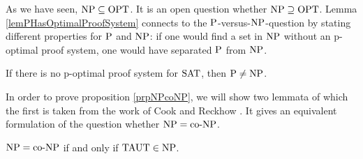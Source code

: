  As we have seen, \(\NP \subseteq \OPT\). It is an open question whether \(\NP \supseteq \OPT\). Lemma \ref{lemPHasOptimalProofSystem} connects to the \(\P\)-versus-\(\NP\)-question by stating different properties for \(\P\) and \(\NP\): if one would find a set in \(\NP\) without an p-optimal proof system, one would have separated \(\P\) from \(\NP\).

  \begin{corollary}
    If there is no p-optimal proof system for \(\SAT\), then \(\P \neq \NP\).
  \end{corollary}  
  
  In order to prove proposition \ref{prpNPcoNP}, we will show two lemmata of which the first is taken from the work of Cook and Reckhow \cite{CR79}. It gives an equivalent formulation of the question whether \(\NP = \coNP\).

  \begin{lemma} \label{lemNPisCoNP}
   \(\NP = \coNP\) if and only if \(\TAUT \in \NP\).
  \end{lemma}
  
